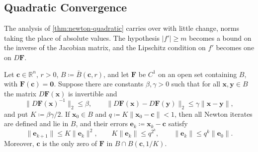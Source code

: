 \begin{table}
\end{table}

\subsection{Quadratic Convergence}

The analysis of \cref{thm:newton-quadratic} carries over with little change, norms taking the place of absolute values. The hypothesis $|f'|\ge m$ becomes a bound on the inverse of the Jacobian matrix, and the Lipschitz condition on $f'$ becomes one on $D\mathbf F$.

\begin{theorem}
\label{thm:newton-n}
Let $\mathbf c\in\mathbb R^n$, $r>0$, $B\coloneqq\bar B(\mathbf c,r)$, and let $\mathbf F$ be $C^1$ on an open set containing $B$, with $\mathbf F(\mathbf c)=\mathbf0$. Suppose there are constants $\beta,\gamma>0$ such that for all $\mathbf x,\mathbf y\in B$ the matrix $D\mathbf F(\mathbf x)$ is invertible and
\[
\|D\mathbf F(\mathbf x)^{-1}\|_2\le\beta,\qquad\|D\mathbf F(\mathbf x)-D\mathbf F(\mathbf y)\|_2\le\gamma\|\mathbf x-\mathbf y\| ,
\]
and put $K\coloneqq\beta\gamma/2$. If $\mathbf x_0\in B$ and $q\coloneqq K\|\mathbf x_0-\mathbf c\|<1$, then all Newton iterates are defined and lie in $B$, and their errors $\mathbf e_k\coloneqq\mathbf x_k-\mathbf c$ satisfy
\[
\|\mathbf e_{k+1}\|\le K\|\mathbf e_k\|^2,\qquad K\|\mathbf e_k\|\le q^{2^k},\qquad\|\mathbf e_k\|\le q^k\|\mathbf e_0\| .
\]
Moreover, $\mathbf c$ is the only zero of $\mathbf F$ in $B\cap B(\mathbf c,1/K)$.
\end{theorem}

